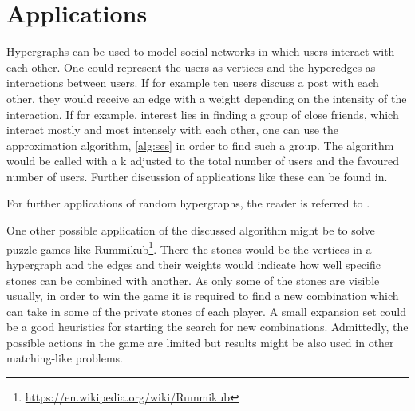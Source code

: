 \chapter{Applications}\label{chapter:applications}
Hypergraphs can be used to model social networks in which users interact with each other. One could represent the users as vertices and the hyperedges as interactions between users. If for example ten users discuss a post with each other, they would receive an edge with a weight depending on the intensity of the interaction. If for example, interest lies in finding a group of close friends, which interact mostly and most intensely with each other, one can use the approximation algorithm, \cref{alg:ses} in order to find such a group. The algorithm would be called with a k adjusted to the total number of users and the favoured number of users. Further discussion of applications like these can be found in\cite{zhang2010hypergraph}.

For further applications of random hypergraphs, the reader is referred to \cite{ghoshal2009random}.

One other possible application of the discussed algorithm might be to solve puzzle games like Rummikub\footnote{\href{https://en.wikipedia.org/wiki/Rummikub}{https://en.wikipedia.org/wiki/Rummikub}}. There the stones would be the vertices in a hypergraph and the edges and their weights would indicate how well specific stones can be combined with another. As only some of the stones are visible usually, in order to win the game it is required to find a new combination which can take in some of the private stones of each player. A small expansion set could be a good heuristics for starting the search for new combinations. Admittedly, the possible actions in the game are limited but results might be also used in other matching-like problems.


